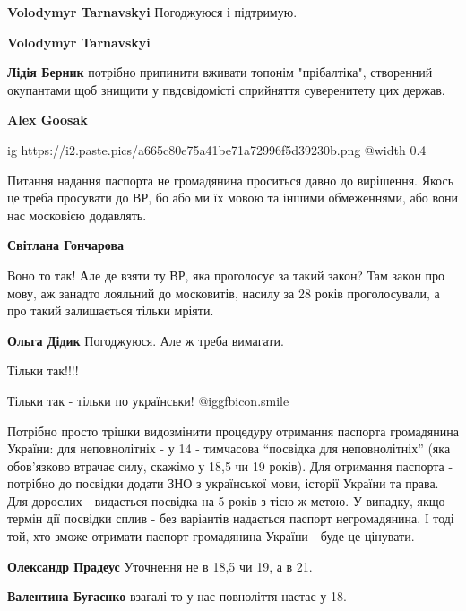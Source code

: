 \begin{itemize}
\begin{itemize}
\textbf{Volodymyr Tarnavskyi} Погоджуюся і підтримую.

\textbf{Volodymyr Tarnavskyi}

\textbf{Лідія Берник} потрібно припинити вживати топонім "прібалтіка", створенний окупантами щоб знищити у пвдсвідомісті сприйняття суверенитету цих держав.

\textbf{Alex Goosak}

\ifcmt
  ig https://i2.paste.pics/a665c80e75a41be71a72996f5d39230b.png
  @width 0.4
\fi

\end{itemize} %


Питання надання паспорта не громадянина проситься давно до вирішення. Якось це
треба просувати до ВР, бо або ми їх мовою та іншими обмеженнями, або вони нас
московією додавлять.

\textbf{Світлана Гончарова} 

Воно то так! Але де взяти ту ВР, яка проголосує за такий закон? Там закон про
мову, аж занадто лояльний до московитів, насилу за 28 років проголосували, а
про такий залишається тільки мріяти.

\textbf{Ольга Дідик} Погоджуюся. Але ж треба вимагати.

Тільки так!!!!

Тільки так - тільки по українськи!  @igg{fbicon.smile} 


Потрібно просто трішки видозмінити процедуру отримання паспорта громадянина
України: для неповнолітніх - у 14 - тимчасова \enquote{посвідка для неповнолітніх} (яка
обов'язково втрачає силу, скажімо у 18,5 чи 19 років). Для отримання паспорта -
потрібно до посвідки додати ЗНО з української мови, історії України та права.
Для дорослих - видається посвідка на 5 років з тією ж метою. У випадку, якщо
термін дії посвідки сплив - без варіантів надається паспорт негромадянина. І
тоді той, хто зможе отримати паспорт громадянина України - буде це цінувати.

\begin{itemize} %
\textbf{Олександр Прадеус} Уточнення не в 18,5 чи 19, а в 21.

\textbf{Валентина Бугаєнко} взагалі то у нас повноліття настає у 18.


\end{itemize}
\end{itemize}
